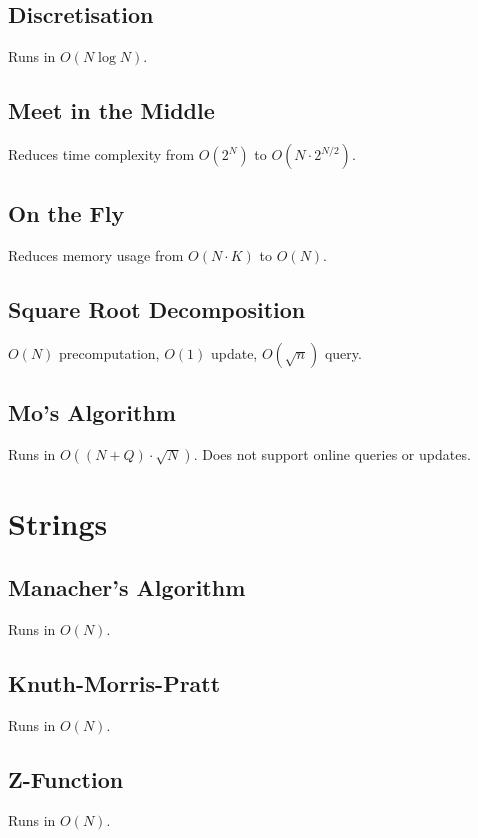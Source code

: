 \documentclass{article}
\begin{document}
\subsection{Discretisation}
Runs in $O(N \log N)$.


\subsection{Meet in the Middle}
Reduces time complexity from $O(2^N)$ to $O(N \cdot 2^{N/2})$.


\subsection{On the Fly}
Reduces memory usage from $O(N \cdot K)$ to $O(N)$.


\subsection{Square Root Decomposition}
$O(N)$ precomputation, $O(1)$ update, $O(\sqrt{n})$ query.


\subsection{Mo's Algorithm}
Runs in $O((N+Q) \cdot \sqrt{N})$. Does not support online queries or updates.


\section{Strings}
\subsection{Manacher's Algorithm}
Runs in $O(N)$.


\subsection{Knuth-Morris-Pratt}
Runs in $O(N)$.


\subsection{Z-Function}
Runs in $O(N)$.

\end{document}
